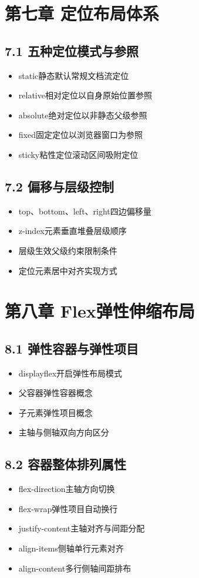 \section{第七章 定位布局体系}
\subsection{7.1 五种定位模式与参照}
\begin{itemize}[leftmargin=*]
\item static静态默认常规文档流定位
\item relative相对定位以自身原始位置参照
\item absolute绝对定位以非静态父级参照
\item fixed固定定位以浏览器窗口为参照
\item sticky粘性定位滚动区间吸附定位
\end{itemize}

\subsection{7.2 偏移与层级控制}
\begin{itemize}[leftmargin=*]
\item top、bottom、left、right四边偏移量
\item z-index元素垂直堆叠层级顺序
\item 层级生效父级约束限制条件
\item 定位元素居中对齐实现方式
\end{itemize}

\section{第八章 Flex弹性伸缩布局}
\subsection{8.1 弹性容器与弹性项目}
\begin{itemize}[leftmargin=*]
\item display\:flex开启弹性布局模式
\item 父容器弹性容器概念
\item 子元素弹性项目概念
\item 主轴与侧轴双向方向区分
\end{itemize}

\subsection{8.2 容器整体排列属性}
\begin{itemize}[leftmargin=*]
\item flex-direction主轴方向切换
\item flex-wrap弹性项目自动换行
\item justify-content主轴对齐与间距分配
\item align-items侧轴单行元素对齐
\item align-content多行侧轴间距排布
\end{itemize}

